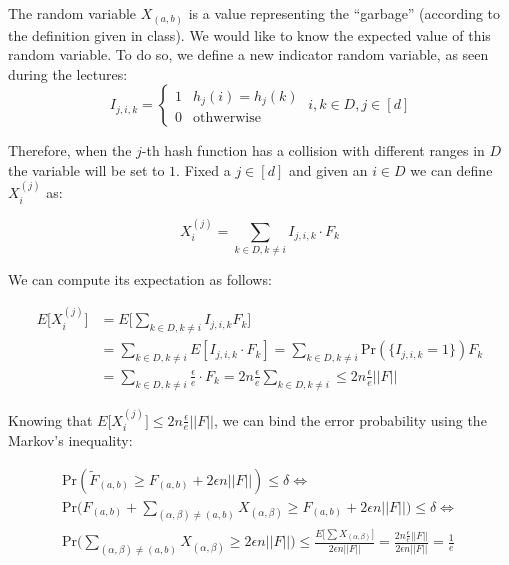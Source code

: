 \documentclass{article}
\begin{document}
\noindent The random variable $X_{(a, b)}$ is a value representing the ``garbage'' (according to the definition given in class). We would like to know the expected value of this random variable.
To do so, we define a new indicator random variable, as seen during the lectures:
\begin{equation*}
    I_{j,i,k} = \begin{cases}
        1 & h_j(i) = h_j(k) \\
        0 & \textrm{othwerwise}
    \end{cases} \; i, k \in D, j \in [d]
\end{equation*}

\noindent Therefore, when the $j$-th hash function has a collision with different ranges in $D$ the variable will be set to $1$. 
Fixed a $j \in [d]$ and given an $i \in D$ we can define $X_{i}^{(j)}$ as: 

\begin{equation*}
    X_{i}^{(j)} = \sum_{k \in D, k \ne i}I_{j, i, k} \cdot  F_k
\end{equation*}

\noindent We can compute its expectation as follows:

\begin{equation*}
    \begin{split}
        E\big[X_{i}^{(j)}\big] & = E\bigg[\sum_{k \in D, k \ne i}I_{j, i, k} F_k\bigg] \\
        & = \sum_{k \in D, k \ne i} E[I_{j, i, k} \cdot F_k] = 
            \sum_{k \in D, k \ne i} \textrm{Pr}(\{I_{j, i, k} = 1\}) F_k \\
        & = \sum_{k \in D, k \ne i} \frac{\epsilon}{e} \cdot  F_k = 
             2n \frac{\epsilon}{e} \sum_{k \in D, k \ne i} 
        \le 2n \frac{\epsilon}{e} ||F||
    \end{split}
\end{equation*}

\noindent Knowing that $E\big[X_{i}^{(j)}\big] \le 2n \frac{\epsilon}{e} ||F||$, we can bind the error probability using the Markov's inequality:

\begin{gather*}
    \textrm{Pr}(\tilde{F}_{(a, b)} \ge F_{(a, b)} + 2\epsilon n ||F||) \le \delta \iff \\
    \textrm{Pr}\bigg(F_{(a, b)} + \sum_{(\alpha, \beta) \ne (a, b)}X_{(\alpha, \beta)} \ge F_{(a, b)} + 2 \epsilon n ||F|| \bigg) \le \delta \iff \\
    \textrm{Pr}\bigg(\sum_{(\alpha, \beta) \ne (a, b)}X_{(\alpha, \beta)} \ge 2 \epsilon n ||F||\bigg) \le \frac{E\bigg[\sum X_(\alpha, \beta)\bigg]}{2 \epsilon n ||F||} = \frac{2n \frac{\epsilon}{e} ||F||}{2 \epsilon n ||F||} = \frac{1}{e}
\end{gather*}
\end{document}
